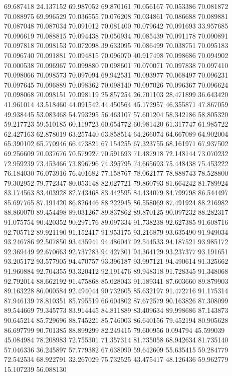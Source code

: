 69.687418
24.137152
69.987052
69.870161
70.056167
70.053386
70.081872
70.088975
69.996529
70.036555
70.076208
70.034861
70.086688
70.089881
70.087048
70.087034
70.091012
70.081400
70.079642
70.091693
33.957685
70.096619
70.088815
70.094438
70.056934
70.085439
70.091178
70.090891
70.097818
70.098153
70.072098
39.633095
70.086499
70.038751
70.095183
70.096740
70.091881
70.094815
70.096070
40.917498
70.098686
70.094902
70.000538
70.096967
70.099880
70.098601
70.070071
70.097838
70.097410
70.098066
70.098573
70.097094
69.942531
70.093977
70.068497
70.096231
70.097645
70.096889
70.098362
70.098140
70.097026
70.096367
70.096624
70.098068
70.098151
70.098119
25.857254
26.701103
28.471899
36.643420
41.961014
43.518460
44.091542
44.450564
45.172957
46.355871
47.867059
49.938445
53.083468
54.793295
56.463107
57.601204
58.342186
58.805320
59.217723
59.510185
60.119723
60.654772
60.981420
61.317747
61.985722
62.427163
62.878019
63.257440
63.858514
64.266074
64.667089
64.902004
65.390102
65.770946
66.473821
67.154255
67.323755
68.161971
67.937502
69.256609
70.037676
70.579927
70.591693
71.487918
72.148144
73.070232
72.959239
73.453466
73.896796
74.395795
74.665693
75.448438
75.453222
76.184030
76.073916
76.401682
77.158767
78.062177
78.888743
78.528800
79.302952
79.772347
80.053148
82.027721
79.860793
81.664242
81.789924
83.174563
83.403928
82.743468
83.442595
84.434079
84.799798
86.544497
85.697765
87.191420
86.826446
88.222945
86.558069
87.491924
88.216982
88.860070
89.454498
89.031267
89.837862
89.870125
90.097232
88.282317
91.075754
90.420352
90.297176
89.097334
91.738238
92.627385
91.608716
92.705712
89.921190
91.152417
91.953175
93.216879
93.635490
91.949034
93.246786
92.507850
93.435941
94.486047
92.544533
94.187521
93.985172
92.369449
92.670663
92.737283
94.427301
94.364129
93.237377
93.191651
93.205172
93.577905
94.470757
93.396187
93.997121
94.490614
91.325662
91.960884
92.704355
93.320412
92.191476
89.948318
91.728345
91.348068
92.792014
88.662192
91.475868
85.028043
91.189341
87.603660
89.879903
89.163228
86.000584
92.494044
90.732605
85.632197
91.472716
91.175314
87.946139
78.810351
85.795519
66.604802
87.672579
90.163826
87.308099
89.544669
79.345773
83.914445
84.811889
83.409634
89.998686
87.143873
90.645214
85.729696
88.745221
85.746003
86.640156
79.452194
80.905628
86.697799
90.701385
88.899299
82.249415
79.600956
0.094794
45.599039
45.084984
78.208983
72.755301
71.357314
81.735058
68.942634
81.735140
57.046336
36.245897
57.779382
67.638090
59.642609
55.635415
59.284779
72.542534
68.922791
32.267029
75.732525
43.475417
48.126436
59.962779
15.107239
56.088130
